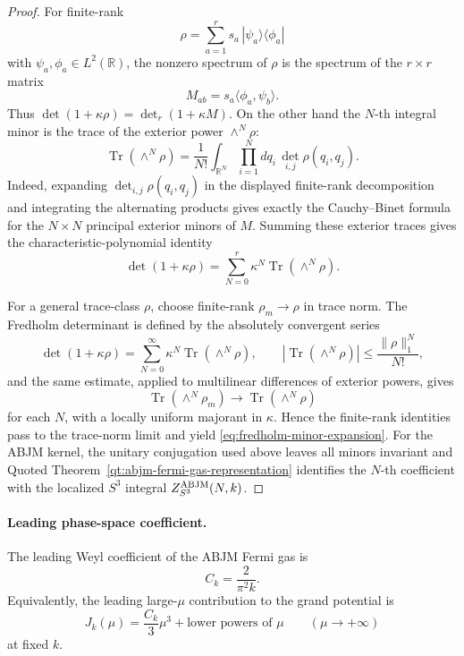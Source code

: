 \begin{proof}
For finite-rank
\[
  \rho=\sum_{a=1}^r s_a\,|\psi_a\rangle\langle\phi_a|
\]
with \(\psi_a,\phi_a\in L^2(\mathbb R)\), the nonzero spectrum of \(\rho\)
is the spectrum of the \(r\times r\) matrix
\[
  M_{ab}=s_a\langle\phi_a,\psi_b\rangle .
\]
Thus \(\det(1+\kappa\rho)=\det_r(1+\kappa M)\).  On the other hand the
\(N\)-th integral minor is the trace of the exterior power
\(\wedge^N\rho\):
\[
  \operatorname{Tr}(\wedge^N\rho)
  =
  \frac1{N!}
  \int_{\mathbb R^N}\prod_{i=1}^N dq_i\,
  \det_{i,j}\rho(q_i,q_j).
\]
Indeed, expanding \(\det_{i,j}\rho(q_i,q_j)\) in the displayed finite-rank
decomposition and integrating the alternating products gives exactly the
Cauchy--Binet formula for the \(N\times N\) principal exterior minors of
\(M\).  Summing these exterior traces gives the characteristic-polynomial
identity
\[
  \det(1+\kappa\rho)
  =
  \sum_{N=0}^r \kappa^N \operatorname{Tr}(\wedge^N\rho).
\]

For a general trace-class \(\rho\), choose finite-rank
\(\rho_m\to\rho\) in trace norm.  The Fredholm determinant is defined by the
absolutely convergent series
\[
  \det(1+\kappa\rho)
  =
  \sum_{N=0}^\infty \kappa^N\operatorname{Tr}(\wedge^N\rho),
  \qquad
  |\operatorname{Tr}(\wedge^N\rho)|
  \le \frac{\|\rho\|_1^N}{N!},
\]
and the same estimate, applied to multilinear differences of exterior
powers, gives
\[
  \operatorname{Tr}(\wedge^N\rho_m)\to
  \operatorname{Tr}(\wedge^N\rho)
\]
for each \(N\), with a locally uniform majorant in \(\kappa\).  Hence the
finite-rank identities pass to the trace-norm limit and yield
\eqref{eq:fredholm-minor-expansion}.  For the ABJM kernel, the unitary
conjugation used above leaves all minors invariant and
Quoted Theorem~\ref{qt:abjm-fermi-gas-representation} identifies the
\(N\)-th coefficient with the localized \(S^3\) integral
\(Z^{\rm ABJM}_{S^3}(N,k)\).
\end{proof}

\paragraph{Leading phase-space coefficient.}
The leading Weyl coefficient of the ABJM Fermi gas is
\begin{equation}
  C_k=\frac{2}{\pi^2 k}.
  \label{eq:abjm-Ck-coefficient}
\end{equation}
Equivalently, the leading large-\(\mu\) contribution to the grand potential
is
\begin{equation}
  J_k(\mu)=\frac{C_k}{3}\mu^3+\text{lower powers of }\mu
  \qquad (\mu\to+\infty)
  \label{eq:abjm-leading-grand-potential}
\end{equation}
at fixed \(k\).

